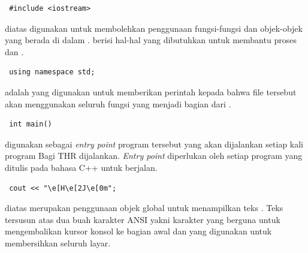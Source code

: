 \documentclass[../main.tex]{subfiles}
\begin{document}
\begin{lstlisting}
 #include <iostream>
\end{lstlisting}
    \ilz{}{\Script} diatas digunakan untuk membolehkan penggunaan fungsi-fungsi dan objek-objek yang berada di dalam {\header} {\file} . {\Header} {\file}  berisi hal-hal yang dibutuhkan untuk membantu proses {\ioi} dan {\ioo}.

\begin{lstlisting}
 using namespace std;
\end{lstlisting}
    \ilz{}{\Script}  adalah {\statement} yang digunakan untuk memberikan perintah kepada {\compiler} bahwa file tersebut akan menggunakan seluruh fungsi yang menjadi bagian dari .

\begin{lstlisting}
 int main() 
\end{lstlisting}
\vspace{-0.25ex}
    \ilz{}{\Script} digunakan sebagai \textit{entry point} program tersebut yang akan dijalankan setiap kali program Bagi THR dijalankan. \textit{Entry point} diperlukan oleh setiap program yang ditulis pada bahasa C++ untuk berjalan.

\begin{lstlisting}
 cout << "\e[H\e[2J\e[0m";
\end{lstlisting}
    \vspace{-0.35ex}
    \ilz{}{\Script} diatas merupakan penggunaan objek global  untuk menampilkan teks \inputscript{\textbackslash e[H\textbackslash e[2J}. Teks \inputscript{\textbackslash e[H\textbackslash e[2J\textbackslash} tersusun atas dua buah karakter ANSI yakni karakter \inputscript{\textbackslash e[H} yang berguna untuk mengembalikan kursor konsol ke bagian awal dan \inputscript{\textbackslash e[2J} yang digunakan untuk membersihkan seluruh layar.
\end{document}

